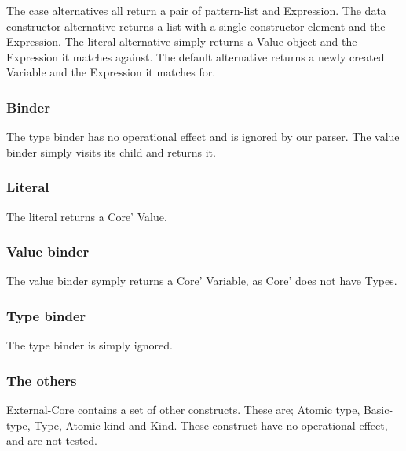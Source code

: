 The case alternatives all return a pair of pattern-list and Expression. The
data constructor alternative returns a list with a single constructor element and
the Expression. The literal alternative simply returns a Value object and the 
Expression it matches against. The default alternative returns a newly created
Variable and the Expression it matches for.

\subsubsection{Binder}

The type binder has no operational effect and is ignored by our parser. The 
value binder simply visits its child and returns it.

\subsubsection{Literal}

The literal returns a Core' Value.


\subsubsection{Value binder}

The value binder symply returns a Core' Variable, as Core' does not have Types.


\subsubsection{Type binder}

The type binder is simply ignored.

\subsubsection{The others}

External-Core contains a set of other constructs. These are;
Atomic type, Basic-type, Type, Atomic-kind and Kind. These construct
have no operational effect, and are not tested.

